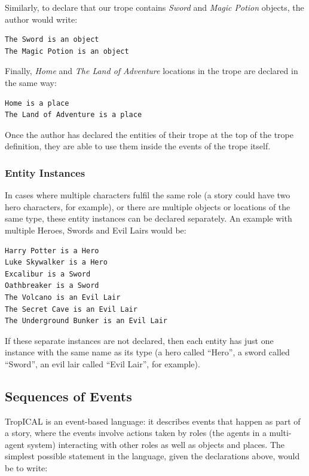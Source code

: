 \documentclass[11pt]{report}
\begin{document}
Similarly, to declare that our trope contains \emph{Sword} and \emph{Magic Potion} objects,
the author would write:

\begin{lstlisting}[label={lst:dec-objs}, caption={Object declarations}]
The Sword is an object
The Magic Potion is an object
\end{lstlisting}

Finally, \emph{Home} and \emph{The Land of Adventure} locations in the
trope are declared in the same way:

\begin{lstlisting}[label={lst:dec-places}, caption={Place declarations}]
Home is a place
The Land of Adventure is a place
\end{lstlisting}

Once the author has declared the entities of their trope at the top of the trope
definition, they are able to use them inside the events of the trope itself.

\subsubsection{Entity Instances}
\label{sec:entity-instances}
In cases where multiple characters fulfil the same role (a story could have two
hero characters, for example), or there are multiple objects or locations of the
same type, these entity instances can be declared separately. An example with multiple Heroes, Swords and Evil Lairs would be:

\begin{lstlisting}[label={lst:dec-instances}, caption={Entity instances}]
Harry Potter is a Hero
Luke Skywalker is a Hero
Excalibur is a Sword
Oathbreaker is a Sword
The Volcano is an Evil Lair
The Secret Cave is an Evil Lair
The Underground Bunker is an Evil Lair
\end{lstlisting}

If these separate instances are not declared, then each entity has just
one instance with the same name as its type (a hero called ``Hero'', a sword
called ``Sword'', an evil lair called ``Evil Lair'', for example).

\subsection{Sequences of Events}
\label{sec:seq-code}
TropICAL is an event-based language: it describes events that happen as part of
a story, where the events involve actions taken by roles (the agents in a
multi-agent system) interacting with other roles as well as objects and places.
The simplest possible statement in the language, given the declarations above,
would be to write:
\end{document}
